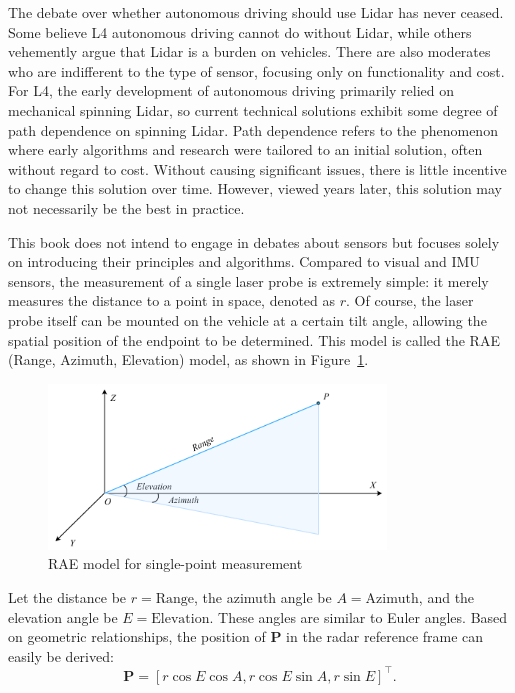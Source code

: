 The debate over whether autonomous driving should use Lidar has never ceased. Some believe L4 autonomous driving cannot do without Lidar, while others vehemently argue that Lidar is a burden on vehicles. There are also moderates who are indifferent to the type of sensor, focusing only on functionality and cost. For L4, the early development of autonomous driving primarily relied on mechanical spinning Lidar, so current technical solutions exhibit some degree of path dependence on spinning Lidar. Path dependence refers to the phenomenon where early algorithms and research were tailored to an initial solution, often without regard to cost. Without causing significant issues, there is little incentive to change this solution over time. However, viewed years later, this solution may not necessarily be the best in practice.  

This book does not intend to engage in debates about sensors but focuses solely on introducing their principles and algorithms. Compared to visual and IMU sensors, the measurement of a single laser probe is extremely simple: it merely measures the distance to a point in space, denoted as $r$. Of course, the laser probe itself can be mounted on the vehicle at a certain tilt angle, allowing the spatial position of the endpoint to be determined. This model is called the RAE (Range, Azimuth, Elevation) model, as shown in Figure~\ref{fig:RAE}.  

\begin{figure}[!htp]  
	\centering  
	\includegraphics[width=0.8\textwidth]{resources/basic-point-cloud/RAE.pdf}  
	\caption{RAE model for single-point measurement}  
	\label{fig:RAE}  
\end{figure}  

Let the distance be $r=\text{Range}$, the azimuth angle be $A=\text{Azimuth}$, and the elevation angle be $E=\text{Elevation}$. These angles are similar to Euler angles. Based on geometric relationships, the position of $\mathbf{P}$ in the radar reference frame can easily be derived:  
\begin{equation}\label{key}  
	\mathbf{P} = \left[r \cos E \cos A, r \cos E \sin A, r \sin E \right] ^\top.  
\end{equation}  

